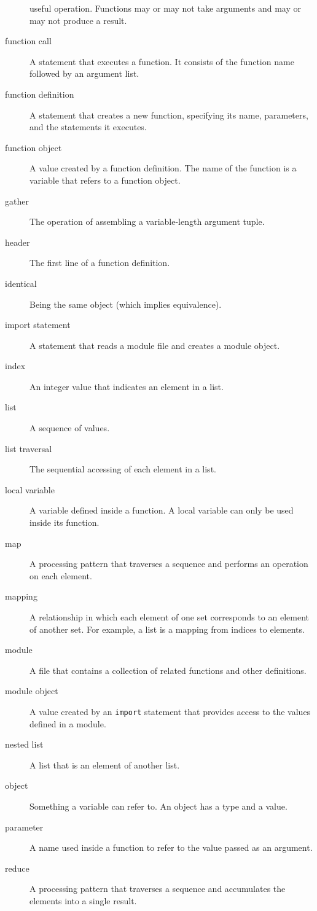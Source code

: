 \documentclass{article}
\begin{document}
\begin{description}
    useful operation. Functions may or may not take arguments and may
    or may not produce a result.
\item [function call] A statement that executes a function. It
    consists of the function name followed by an argument list.
\item [function definition] A statement that creates a new function,
    specifying its name, parameters, and the statements it executes.
\item [function object] A value created by a function definition. The
    name of the function is a variable that refers to a function
    object.
\item [gather] The operation of assembling a variable-length argument
    tuple.
\item [header] The first line of a function definition.
\item [identical] Being the same object (which implies equivalence).
\item [import statement] A statement that reads a module file and
    creates a module object.
\item [index] An integer value that indicates an element in a list.
\item [list] A sequence of values.
\item [list traversal] The sequential accessing of each element in a list.
\item [local variable] A variable defined inside a function. A local
    variable can only be used inside its function.
\item [map] A processing pattern that traverses a sequence and performs an operation on each element.
\item [mapping] A relationship in which each element of one set corresponds to an element of another set. For example, a list is a mapping from indices to elements.
\item [module] A file that contains a collection of related functions
    and other definitions.
\item [module object] A value created by an \verb|import| statement
    that provides access to the values defined in a module.
\item [nested list] A list that is an element of another list.
\item [object] Something a variable can refer to. An object has a type and a value.
\item [parameter] A name used inside a function to refer to the value
    passed as an argument.
\item [reduce] A processing pattern that traverses a sequence and accumulates the elements into a single result.

\end{description}
\end{document}
